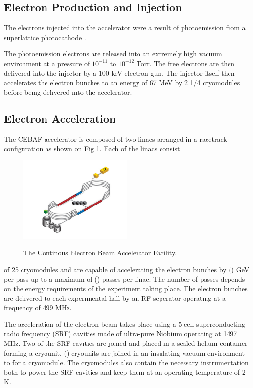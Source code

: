 \subsection{Electron Production and Injection}

The electrons injected into the accelerator were a result of photoemission from
a superlattice photocathode \cite{}.

The photoemission electrons are released into an extremely high vacuum
environment at a pressure of $10^{-11}$ to $10^{-12}$ Torr.  The free electrons
are then delivered into the injector by a 100 keV electron gun.  The injector
itself then accelerates the electron bunches to an energy of 67 MeV by 2 1/4
cryomodules before being delivered into the accelerator.

\subsection{Electron Acceleration}

The CEBAF accelerator is composed of two linacs arranged in a racetrack
configuration as shown on Fig \ref{fig:cebaf}. Each of the linacs consist
\begin{figure}[h]
    \centering
    \caption{The Continous Electron Beam Accelerator Facility.}
    \includegraphics[width=0.5\textwidth]{images/cebaf.jpg}
    \label{fig:cebaf}
\end{figure}
of 25 cryomodules and are capable of accelerating the electron bunches 
by () GeV per pass up to a maximum of () passes per linac.  The number of 
passes depends on the energy requirements of the experiment taking place.
The electron bunches are delivered to each experimental hall by an RF seperator
operating at a frequency of 499 MHz. 

The acceleration of the electron beam takes place using a 5-cell 
superconducting radio frequency (SRF) cavities made of ultra-pure Niobium 
operating at 1497 MHz.  Two of the SRF cavities are joined and placed in a 
sealed helium container forming a cryounit.  () cryounits are joined in an
insulating vacuum environment to for a cryomodule.  The cryomodules also
contain the necessary instrumentation both to power the SRF cavities and keep
them at an operating temperature of 2 K.

